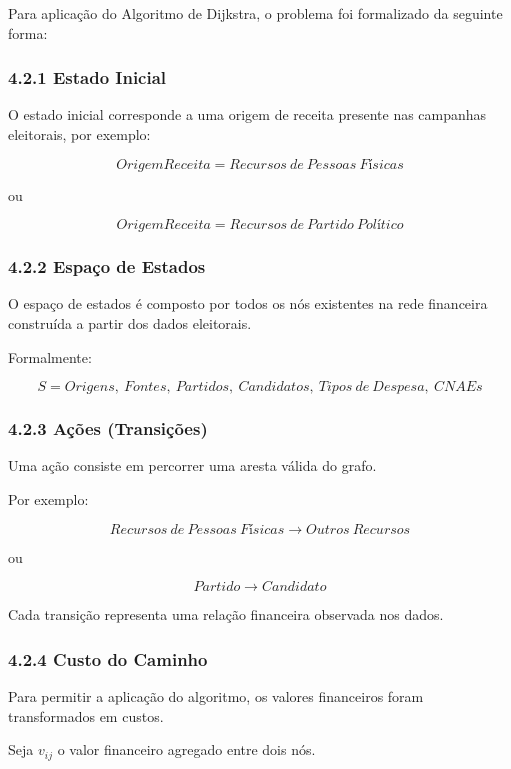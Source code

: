 \documentclass[11pt]{article}
\begin{document}
Para aplicação do Algoritmo de Dijkstra, o problema foi formalizado da
seguinte forma:

\subsubsection{4.2.1 Estado Inicial}\label{estado-inicial}

O estado inicial corresponde a uma origem de receita presente nas
campanhas eleitorais, por exemplo:

\[
OrigemReceita = Recursos\ de\ Pessoas\ Físicas
\]

ou

\[
OrigemReceita = Recursos\ de\ Partido\ Político
\]

\subsubsection{4.2.2 Espaço de Estados}\label{espauxe7o-de-estados}

O espaço de estados é composto por todos os nós existentes na rede
financeira construída a partir dos dados eleitorais.

Formalmente:

\[
S = {Origens,\ Fontes,\ Partidos,\ Candidatos,\ Tipos\ de\ Despesa,\ CNAEs}
\]

\subsubsection{4.2.3 Ações
(Transições)}\label{auxe7uxf5es-transiuxe7uxf5es}

Uma ação consiste em percorrer uma aresta válida do grafo.

Por exemplo:

\[
Recursos\ de\ Pessoas\ Físicas
\rightarrow
Outros\ Recursos
\]

ou

\[
Partido
\rightarrow
Candidato
\]

Cada transição representa uma relação financeira observada nos dados.

\subsubsection{4.2.4 Custo do Caminho}\label{custo-do-caminho}

Para permitir a aplicação do algoritmo, os valores financeiros foram
transformados em custos.

Seja \(v_{ij}\) o valor financeiro agregado entre dois nós.
\end{document}
